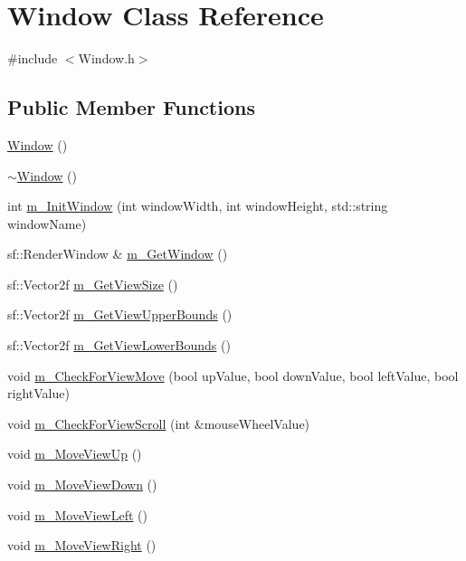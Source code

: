 \hypertarget{class_window}{}\section{Window Class Reference}
\label{class_window}


{\ttfamily \#include $<$Window.\+h$>$}

\subsection*{Public Member Functions}
\begin{DoxyCompactItemize}
\item 
\mbox{\hyperlink{class_window_a74e6087da23d3c24e9fac0245e5ec92c}{Window}} ()
\item 
\mbox{\hyperlink{class_window_a245d821e6016fa1f6970ccbbedd635f6}{$\sim$\+Window}} ()
\item 
int \mbox{\hyperlink{class_window_aa5fa7e2990fc960995c132630083844e}{m\+\_\+\+Init\+Window}} (int window\+Width, int window\+Height, std\+::string window\+Name)
\item 
sf\+::\+Render\+Window \& \mbox{\hyperlink{class_window_a1962bb9a9c39e16b470e550fd0be279b}{m\+\_\+\+Get\+Window}} ()
\item 
sf\+::\+Vector2f \mbox{\hyperlink{class_window_af25bbe6f050d276e8fce47bb6e263180}{m\+\_\+\+Get\+View\+Size}} ()
\item 
sf\+::\+Vector2f \mbox{\hyperlink{class_window_a30f5b2ffa5ca5ef09d93389d266aafa4}{m\+\_\+\+Get\+View\+Upper\+Bounds}} ()
\item 
sf\+::\+Vector2f \mbox{\hyperlink{class_window_ac438e5112229fa2a0626efd2f40468e2}{m\+\_\+\+Get\+View\+Lower\+Bounds}} ()
\item 
void \mbox{\hyperlink{class_window_a135fde3c6c15ff583e91ec17cb2d3766}{m\+\_\+\+Check\+For\+View\+Move}} (bool up\+Value, bool down\+Value, bool left\+Value, bool right\+Value)
\item 
void \mbox{\hyperlink{class_window_ac208a2c7f0e6fddc0f94d3d64badea28}{m\+\_\+\+Check\+For\+View\+Scroll}} (int \&mouse\+Wheel\+Value)
\item 
void \mbox{\hyperlink{class_window_af3a660b378a2b3c37f3e8e659fed34ea}{m\+\_\+\+Move\+View\+Up}} ()
\item 
void \mbox{\hyperlink{class_window_a3de665891c06fec35dbfb719a4db7ab7}{m\+\_\+\+Move\+View\+Down}} ()
\item 
void \mbox{\hyperlink{class_window_ab4e96dbf4512f3c7d07aa07f98df74b1}{m\+\_\+\+Move\+View\+Left}} ()
\item 
void \mbox{\hyperlink{class_window_af8ea10a23968b335c3e7ece2041641b9}{m\+\_\+\+Move\+View\+Right}} ()
\end{DoxyCompactItemize}


